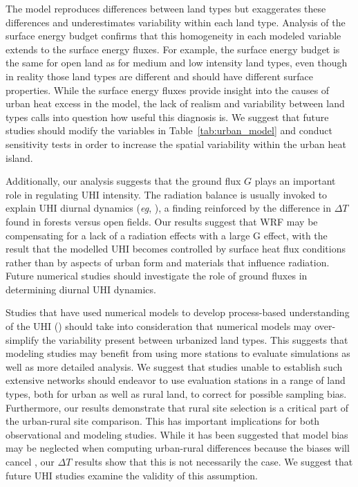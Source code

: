 The model reproduces differences between land types but exaggerates these differences and underestimates variability within each land type. Analysis of the surface energy budget confirms that this homogeneity in each modeled variable extends to the surface energy fluxes.  
For example, the surface energy budget is the same for open land as for medium and low intensity land types, even though in reality those land types are different and should have different surface properties. While the surface energy fluxes provide insight into the causes of urban heat excess in the model, the lack of realism and variability between land types calls into question how useful this diagnosis is. 
We suggest that future studies should modify the variables in Table~\ref{tab:urban_model} and conduct sensitivity tests in order to increase the spatial variability within the urban heat island.

Additionally, our analysis suggests that the ground flux $G$ plays an important role in regulating UHI intensity. 
The radiation balance is usually invoked to explain UHI diurnal dynamics (\textit{eg}, \cite{oke82}), a finding reinforced by the difference in $\Delta T$ found in forests versus open fields.
Our results suggest that WRF may be compensating for a lack of a radiation effects with a large G effect, with the result that the modelled UHI becomes controlled by surface heat flux conditions rather than by aspects of urban form and materials that influence radiation.
Future numerical studies should investigate the role of ground fluxes in determining diurnal UHI dynamics. 

Studies that have used numerical models to develop process-based understanding of the UHI (\citep{zhang2011impact,li2013modeling,li2015contrasting,li2013synergistic}) should take into consideration that numerical models may over-simplify the variability present between urbanized land types. 
This suggests that modeling studies may benefit from using more stations to evaluate simulations as well as more detailed analysis. We suggest that studies unable to establish such extensive networks should endeavor to use evaluation stations in a range of land types, both for urban as well as rural land, to correct for possible sampling bias. 
Furthermore, our results demonstrate that rural site selection is a critical part of the urban-rural site comparison. 
This has important implications for both observational and modeling studies.
While it has been suggested that model bias may be neglected when computing urban-rural differences because the biases will cancel \citep{li2013synergistic}, our $\Delta T$ results show that this is not necessarily the case. 
We suggest that future UHI studies examine the validity of this assumption. 


